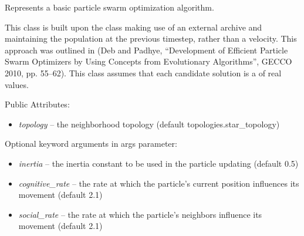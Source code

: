\documentclass[letterpaper,10pt,english]{sphinxmanual}
\begin{document}
\begin{fulllineitems}
\label{reference:inspyred.swarm.PSO}
Represents a basic particle swarm optimization algorithm.

This class is built upon the  class making
use of an external archive and maintaining the population at the previous
timestep, rather than a velocity. This approach was outlined in 
(Deb and Padhye, ``Development of Efficient Particle Swarm Optimizers by
Using Concepts from Evolutionary Algorithms'', GECCO 2010, pp. 55--62).
This class assumes that each candidate solution is a  of
real values.

Public Attributes:
\begin{itemize}
\item {} 
\emph{topology} -- the neighborhood topology (default topologies.star\_topology)

\end{itemize}

Optional keyword arguments in  args parameter:
\begin{itemize}
\item {} 
\emph{inertia} -- the inertia constant to be used in the particle 
updating (default 0.5)

\item {} 
\emph{cognitive\_rate} -- the rate at which the particle's current 
position influences its movement (default 2.1)

\item {} 
\emph{social\_rate} -- the rate at which the particle's neighbors 
influence its movement (default 2.1)

\end{itemize}

\end{fulllineitems}

\end{document}
